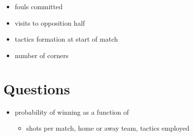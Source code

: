 \documentclass[
  letterpaper,
  DIV=11,
  numbers=noendperiod]{scrartcl}
\providecommand{\tightlist}{%
  \setlength{\itemsep}{0pt}\setlength{\parskip}{0pt}}\usepackage{longtable,booktabs,array}
\begin{document}
\renewcommand*{\arraystretch}{1}

\begin{itemize}
\tightlist
\item
  fouls committed
\item
  visits to opposition half
\item
  tactics formation at start of match
\item
  number of corners
\end{itemize}

\hypertarget{questions}{%
\section{Questions}\label{questions}}

\begin{itemize}
\item
  probability of winning as a function of

  \begin{itemize}
  \tightlist
  \item
    shots per match, home or away team, tactics employed
  \end{itemize}
\end{itemize}
\end{document}
